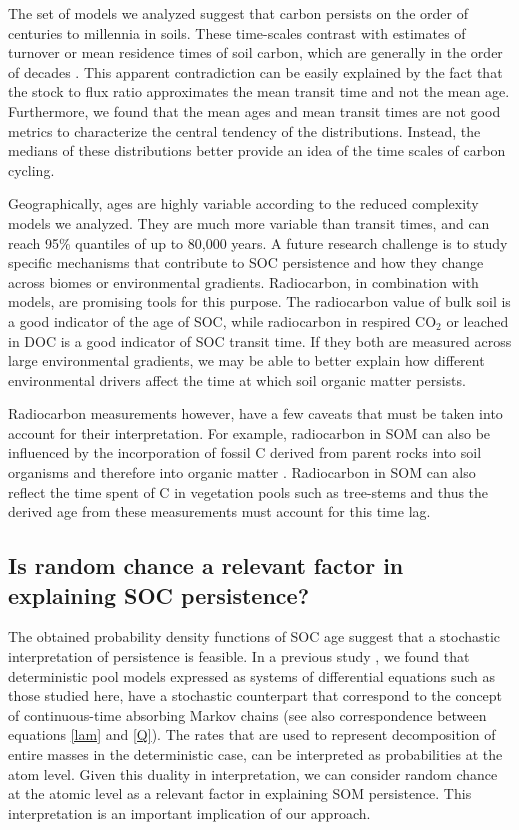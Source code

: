 \documentclass[draft,linenumbers]{agujournal}
\begin{document}
The set of models we analyzed suggest that carbon persists on the order of centuries to millennia in soils. These time-scales contrast with estimates of turnover or mean residence times of soil carbon, which are generally in the order of decades \citep{Carvalhais2014, Wang2018}. This apparent contradiction can be easily explained by the fact that the stock to flux ratio approximates the mean transit time and not the mean age. Furthermore, we found that the mean ages and mean transit times are not good metrics to characterize the central tendency of the distributions. Instead, the medians of these distributions better provide an idea of the time scales of carbon cycling. 

Geographically, ages are highly variable according to the reduced complexity models we analyzed. They are much more variable than transit times, and can reach 95\% quantiles of up to 80,000 years. A future research challenge is to study specific mechanisms that contribute to SOC persistence and how they change across biomes or environmental gradients. Radiocarbon, in combination with models, are promising tools for this purpose. The radiocarbon value of bulk soil is a good indicator of the age of SOC, while radiocarbon in respired CO$_2$ or leached in DOC is a good indicator of SOC transit time. If they both are measured across large environmental gradients, we may be able to better explain how different environmental drivers affect the time at which soil organic matter persists. 

Radiocarbon measurements however, have a few caveats that must be taken into account for their interpretation. For example, radiocarbon in SOM can also be influenced by the incorporation  of fossil C derived from parent rocks into soil organisms and therefore into organic matter \citep{Seifert2013}. Radiocarbon in SOM can also reflect the time spent of C in vegetation pools such as tree-stems and thus the derived age from these measurements must account for this time lag.

\subsection{Is random chance a relevant factor in explaining SOC persistence?}
The obtained probability density functions of SOC age suggest that a stochastic interpretation of persistence is feasible. In a previous study \citep{Metzler2018MG}, we found that deterministic pool models expressed as systems of differential equations such as those studied here, have a stochastic counterpart that correspond to the concept of continuous-time absorbing Markov chains (see also correspondence between equations \ref{lam} and \ref{Q}). The rates that are used to represent decomposition of entire masses in the deterministic case, can be interpreted as probabilities at the atom level. Given this duality in interpretation, we can consider random chance at the atomic level as a relevant factor in explaining SOM persistence. This interpretation is an important implication of our approach. 
\end{document}
